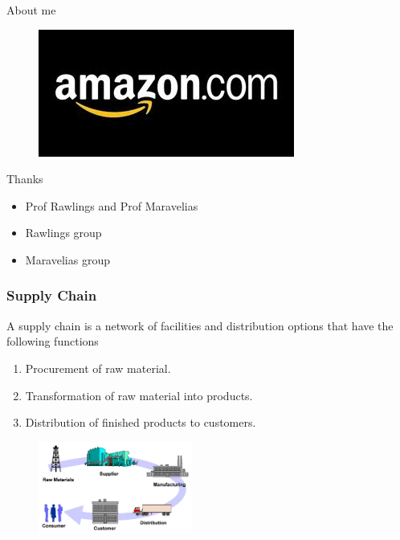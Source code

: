 \documentclass[table]{beamer}
\begin{document}
{\begin{frame}{About me}
\begin{figure}
   \end{figure}
   \begin{figure}
    \includegraphics[scale =0.25]{amazon.jpeg}
   \end{figure}
 \end{frame}
\begin{frame}{Thanks}
  \begin{itemize}
    \item Prof Rawlings and Prof Maravelias
    \item Rawlings group
    \item Maravelias group
  \end{itemize}
\end{frame}
}
   
\begin{frame}
\setcounter{framenumber}{1}
  \frametitle{Supply Chain}
  A supply chain is a \alert{network of facilities and distribution options} that have the following functions
  \begin{enumerate}
   \item Procurement of raw material.
   \item Transformation of raw material into products.
   \item Distribution of finished products to customers.
  \end{enumerate}

  \begin{figure}
    \includegraphics[width = 0.45\textwidth]{supply_chain.jpg}
  \end{figure}
\end{frame}
\end{document}
